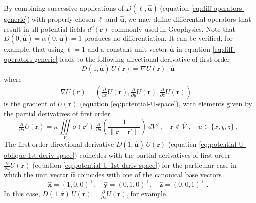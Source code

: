 By combining successive applications of $D(\ell, \hat{\mathbf{u}})$ (equation \ref{eq:diff-operators-generic})
with properly chosen $\ell$ and $\hat{\mathbf{u}}$, we may define differential operators that 
result in all potential fields $d^{o}(\mathbf{r})$ commonly used in Geophysics.
Note that $D(0, \hat{\mathbf{u}}) = \alpha(0, \hat{\mathbf{u}}) = 1$ produces no differentiation.
It can be verified, for example, that using $\ell = 1$ and a constant unit vector $\hat{\mathbf{u}}$
in equation \ref{eq:diff-operators-generic} leads to the following directional derivative 
of first order
\begin{equation}
	D(1, \hat{\mathbf{u}}) \, U(\mathbf{r}) = \nabla U(\mathbf{r})^{\top} \hat{\mathbf{u}}
	\label{eq:potential-U-oblique-1st-deriv-space}
\end{equation}
where
\begin{equation}
	\nabla U(\mathbf{r}) = \left( 
	\tfrac{\partial}{\partial x} U(\mathbf{r}),
	\tfrac{\partial}{\partial y} U(\mathbf{r}),
	\tfrac{\partial}{\partial z} U(\mathbf{r}) \right)^{\top}
	\label{eq:potential-U-grad-space}
\end{equation}
is the gradient of $U(\mathbf{r})$ (equation \ref{eq:potential-U-space}), with elements
given by the partial derivatives of first order
\begin{equation}
	\tfrac{\partial}{\partial u} U(\mathbf{r}) = \kappa \iiint\limits_{\mathcal{V}}
	\sigma(\mathbf{r}') \: 
	\tfrac{\partial}{\partial u} \left( \frac{1}{\| \mathbf{r} - \mathbf{r}'\|} \right)
	\: d\mathcal{V}' \: , 
	\quad \mathbf{r} \notin \overline{\mathcal{V}} \: , \quad u \in \{ x, y, z \} \: .
	\label{eq:potential-U-1st-deriv-space}
\end{equation}
The first-order directional derivative $D(1, \hat{\mathbf{u}}) \, U(\mathbf{r})$ (equation \ref{eq:potential-U-oblique-1st-deriv-space})
coincides with the partial derivatives of first order $\tfrac{\partial}{\partial u} U(\mathbf{r})$ (equation \ref{eq:potential-U-1st-deriv-space})
for the particular case in which the unit vector $\hat{\mathbf{u}}$ coincides with one of the canonical base vectors
\begin{equation}
	\hat{\mathbf{x}} = (1,0,0)^{\top} , \quad 
	\hat{\mathbf{y}} = (0,1,0)^{\top} , \quad
	\hat{\mathbf{z}} = (0,0,1)^{\top} \: .
	\label{eq:canonical-base-vector}
\end{equation}
In this case, $D(1, \hat{\mathbf{z}}) \, U(\mathbf{r}) = \tfrac{\partial}{\partial z} U(\mathbf{r})$, for example.

